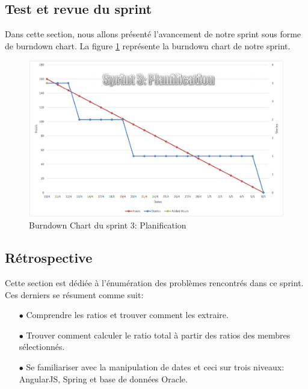 \subsection{Test et revue du sprint}
Dans cette section, nous allons présenté l’avancement de notre sprint sous forme de burndown chart. La figure \ref{code97} représente la burndown chart de notre sprint.
\begin{figure}[H]
  \centering
 \includegraphics[scale=0.7]{figures/burndown_chart/sprint3.png}
 \caption{Burndown Chart du sprint 3: Planification}
 \label{code97}
\end{figure}

\subsection{Rétrospective}
Cette section est dédiée à l'énumération des problèmes rencontrés dans ce sprint. Ces derniers se résument comme suit:
\begin{itemize}
    \item[$\bullet$] Comprendre les ratios et trouver comment les extraire.
    \item[$\bullet$] Trouver comment calculer le ratio total à partir des ratios des membres sélectionnés.
    \item[$\bullet$] Se familiariser avec la manipulation de dates et ceci sur trois niveaux: AngularJS, Spring et base de données Oracle.
\end{itemize}
